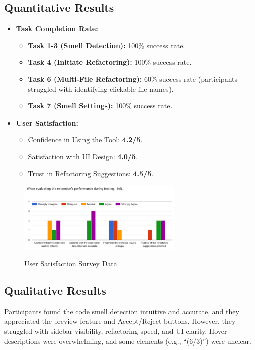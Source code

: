 \documentclass[12pt, titlepage]{article}
\begin{document}
\subsection*{Quantitative Results}
\begin{itemize}
    \item \textbf{Task Completion Rate:}
        \begin{itemize}
            \item \textbf{Task 1-3 (Smell Detection):} 100\% success rate.
            \item \textbf{Task 4 (Initiate Refactoring):} 100\% success rate.
            \item \textbf{Task 6 (Multi-File Refactoring):} 60\% success rate (participants struggled with identifying clickable file names).
            \item \textbf{Task 7 (Smell Settings):} 100\% success rate.
        \end{itemize}
    \item \textbf{User Satisfaction:}
        \begin{itemize}
            \item Confidence in Using the Tool: \textbf{4.2/5}.
            \item Satisfaction with UI Design: \textbf{4.0/5}.
            \item Trust in Refactoring Suggestions: \textbf{4.5/5}.
        \end{itemize}
\end{itemize}

\begin{figure}[H]
  \centering
  \includegraphics[width=0.7\textwidth]{../Images/usability-satisfaction-graph.png}
  \label{img:usability-satisfaction}
  \caption{User Satisfaction Survey Data}
\end{figure}

\subsection*{Qualitative Results}
Participants found the code smell detection intuitive and accurate, and they appreciated the preview feature and Accept/Reject buttons. However, they struggled with sidebar visibility, refactoring speed, and UI clarity. Hover descriptions were overwhelming, and some elements (e.g., ``(6/3)'') were unclear.
\end{document}
